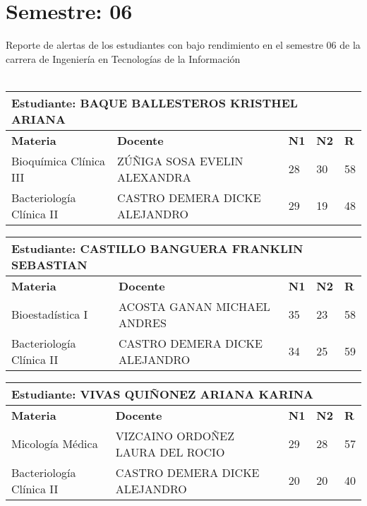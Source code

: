 \section{Semestre: 06}
        Reporte de alertas de los estudiantes con bajo rendimiento en el semestre 06 de la carrera de 
        Ingeniería en Tecnologías de la Información\\\\\small
\begin{tabularx}{\textwidth}{|p{5cm}|p{7cm}|X|X|X|}
\hline
\multicolumn{5}{|p{\dimexpr\textwidth-2\tabcolsep-2\arrayrulewidth}|}{\textbf{Estudiante: BAQUE BALLESTEROS KRISTHEL ARIANA }}\\\hline
\textbf{Materia} & \textbf{Docente} & \textbf{N1} & \textbf{N2} & \textbf{R} \\ \hline
Bioquímica Clínica III & ZÚÑIGA SOSA EVELIN ALEXANDRA  & 28 & 30& 58 \\ \hline
Bacteriología Clínica II & CASTRO DEMERA DICKE ALEJANDRO  & 29 & 19& 48 \\ \hline
\end{tabularx}\vspace{10mm}
\small
\begin{tabularx}{\textwidth}{|p{5cm}|p{7cm}|X|X|X|}
\hline
\multicolumn{5}{|p{\dimexpr\textwidth-2\tabcolsep-2\arrayrulewidth}|}{\textbf{Estudiante: CASTILLO BANGUERA FRANKLIN SEBASTIAN }}\\\hline
\textbf{Materia} & \textbf{Docente} & \textbf{N1} & \textbf{N2} & \textbf{R} \\ \hline
Bioestadística I & ACOSTA GANAN MICHAEL ANDRES  & 35 & 23& 58 \\ \hline
Bacteriología Clínica II & CASTRO DEMERA DICKE ALEJANDRO  & 34 & 25& 59 \\ \hline
\end{tabularx}\vspace{10mm}
\small
\begin{tabularx}{\textwidth}{|p{5cm}|p{7cm}|X|X|X|}
\hline
\multicolumn{5}{|p{\dimexpr\textwidth-2\tabcolsep-2\arrayrulewidth}|}{\textbf{Estudiante: VIVAS QUIÑONEZ ARIANA KARINA }}\\\hline
\textbf{Materia} & \textbf{Docente} & \textbf{N1} & \textbf{N2} & \textbf{R} \\ \hline
Micología Médica & VIZCAINO ORDOÑEZ LAURA DEL ROCIO   & 29 & 28& 57 \\ \hline
Bacteriología Clínica II & CASTRO DEMERA DICKE ALEJANDRO  & 20 & 20& 40 \\ \hline
\end{tabularx}\vspace{10mm}
